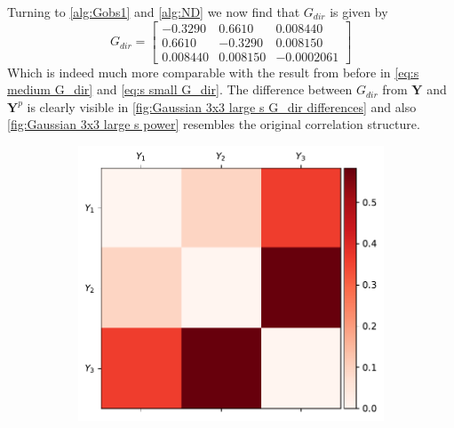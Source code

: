 \documentclass[../Thesis.tex]{subfiles}
\begin{document}
\begin{example}
\begin{figure}[H]
        \caption{}
        \label{fig:Gaussian 3x3 large s power X3 KDE}
    \end{figure}
    Turning to \autoref{alg:Gobs1} and \autoref{alg:ND} we now find that $G_{dir}$ is given by
    $$G_{dir} =
        \begin{bmatrix}
            -0.3290  & 0.6610   & 0.008440   \\
            0.6610   & -0.3290  & 0.008150   \\
            0.008440 & 0.008150 & -0.0002061
        \end{bmatrix}
    $$
    Which is indeed much more comparable with the result from before in \autoref{eq:s medium G_dir} and \autoref{eq:s small G_dir}. The difference between $G_{dir}$ from $\boldsymbol Y$ and $\boldsymbol Y^p$ is clearly visible in \autoref{fig:Gaussian 3x3 large s G_dir differences} and also \autoref{fig:Gaussian 3x3 large s power} resembles the original correlation structure.
    \begin{figure}[H]
        \centering
        \begin{subfigure}[t]{0.49\textwidth}
            \centering
            \includegraphics[width=\linewidth]{figures/ND examples/Gaussian 3x3 large s.pdf}
            \caption{}
            \label{fig:Gaussian 3x3 large s}
        \end{subfigure}%
        ~
        \begin{subfigure}[t]{0.49\textwidth}
            \centering

\end{subfigure}
\end{figure}
\end{example}
\end{document}
